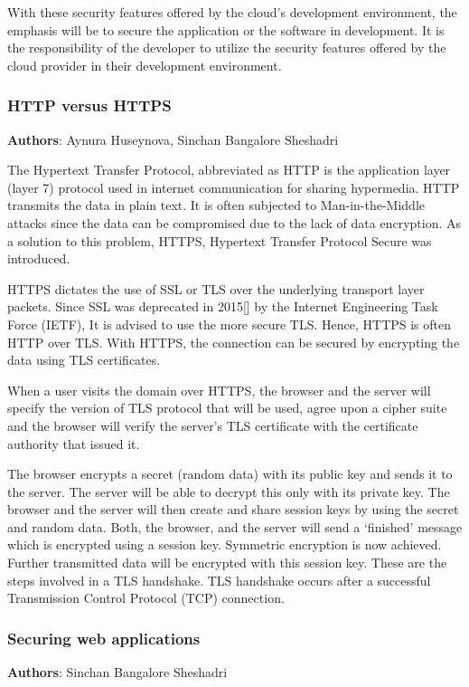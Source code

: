 With these security features offered by the cloud’s development environment, the emphasis will be to secure the application or the software in development. It is the responsibility of the developer to utilize the security features offered by the cloud provider in their development environment.


\subsubsection{HTTP versus HTTPS}
\textbf{Authors}: Aynura Huseynova, Sinchan Bangalore Sheshadri


The Hypertext Transfer Protocol, abbreviated as HTTP is the application layer (layer 7) protocol used in internet communication for sharing hypermedia. HTTP transmits the data in plain text. It is often subjected to Man-in-the-Middle attacks since the data can be compromised due to the lack of data encryption. As a solution to this problem, HTTPS, Hypertext Transfer Protocol Secure was introduced.

HTTPS dictates the use of SSL or TLS over the underlying transport layer packets. Since SSL was deprecated in 2015[] by the Internet Engineering Task Force (IETF), It is advised to use the more secure TLS. Hence, HTTPS is often HTTP over TLS. With HTTPS, the connection can be secured by encrypting the data using TLS certificates.

When a user visits the domain over HTTPS, the browser and the server will specify the version of TLS protocol that will be used, agree upon a cipher suite and the browser will verify the server’s TLS certificate with the certificate authority that issued it.

The browser encrypts a secret (random data) with its public key and sends it to the server. The server will be able to decrypt this only with its private key. The browser and the server will then create and share session keys by using the secret and random data. Both, the browser, and the server will send a ‘finished’ message which is encrypted using a session key. Symmetric encryption is now achieved. Further transmitted data will be encrypted with this session key. These are the steps involved in a TLS handshake. TLS handshake occurs after a successful Transmission Control Protocol (TCP) connection.



\subsubsection{Securing web applications}
\textbf{Authors}: Sinchan Bangalore Sheshadri

